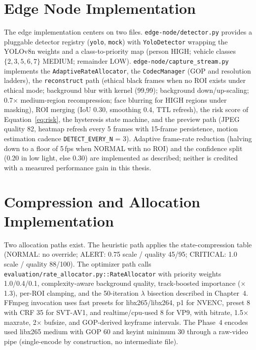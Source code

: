 \section{Edge Node Implementation}

The edge implementation centers on two files. \texttt{edge-node/detector.py} provides a pluggable detector registry (\texttt{yolo}, \texttt{mock}) with \texttt{YoloDetector} wrapping the YOLOv8n weights and a class-to-priority map (person HIGH; vehicle classes $\{2,3,5,6,7\}$ MEDIUM; remainder LOW). \texttt{edge-node/capture\_stream.py} implements the \texttt{AdaptiveRateAllocator}, the \texttt{CodecManager} (GOP and resolution ladders), the \texttt{reconstruct} path (ethical black frames when no ROI exists under ethical mode; background blur with kernel (99,99); background down/up-scaling; 0.7$\times$ medium-region recompression; face blurring for HIGH regions under masking), ROI merging (IoU 0.30, smoothing 0.4, TTL refresh), the risk score of Equation~\ref{eq:risk}, the hysteresis state machine, and the preview path (JPEG quality 82, heatmap refresh every 5 frames with 15-frame persistence, motion estimation cadence \texttt{DETECT\_EVERY\_N} = 3). Adaptive frame-rate reduction (halving down to a floor of 5\,fps when NORMAL with no ROI) and the confidence split (0.20 in low light, else 0.30) are implemented as described; neither is credited with a measured performance gain in this thesis.

\section{Compression and Allocation Implementation}

Two allocation paths exist. The heuristic path applies the state-compression table (NORMAL: no override; ALERT: 0.75 scale / quality 45/95; CRITICAL: 1.0 scale / quality 88/100). The optimizer path calls \texttt{evaluation/rate\_allocator.py::RateAllocator} with priority weights 1.0/0.4/0.1, complexity-aware background quality, track-boosted importance ($\times$1.3), per-ROI clamping, and the 50-iteration $\lambda$ bisection described in Chapter~4. FFmpeg invocation uses fast presets for libx265/libx264, p1 for NVENC, preset 8 with CRF 35 for SVT-AV1, and realtime/cpu-used 8 for VP9, with bitrate, 1.5$\times$ maxrate, 2$\times$ bufsize, and GOP-derived keyframe intervals. The Phase~4 encodes used libx265 medium with GOP 60 and keyint minimum 30 through a raw-video pipe (single-encode by construction, no intermediate file).

